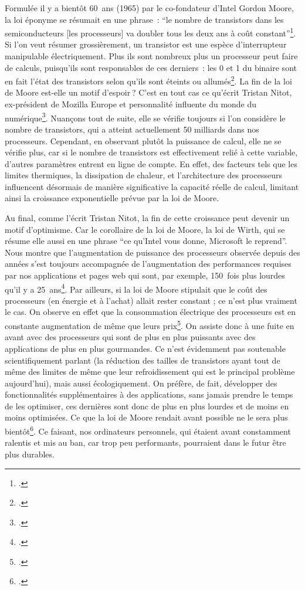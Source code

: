 Formulée il y a bientôt 60 ans (1965) par le co-fondateur d’Intel Gordon Moore, la loi éponyme se résumait en une phrase : \enquote{le nombre de transistors dans les semiconducteurs [les processeurs] va doubler tous les deux ans à coût constant}\footcite{zotero-301}. Si l’on veut résumer grossièrement, un transistor est une espèce d’interrupteur manipulable électriquement. Plus ils sont nombreux plus un processeur peut faire de calculs, puisqu’ils sont responsables de ces derniers : les 0 et 1 du binaire sont en fait l’état des transistors selon qu’ils sont éteints ou allumés\footcite{2024e}. La fin de la loi de Moore est-elle un motif d’espoir ? C’est en tout cas ce qu’écrit Tristan Nitot, ex-président de Mozilla Europe et personnalité influente du monde du numérique\footcite{nitot_loi_2024}. Nuançons tout de suite, elle se vérifie toujours si l'on considère le nombre de transistors, qui a atteint actuellement 50 milliards dans nos processeurs. Cependant, en observant plutôt la puissance de calcul, elle ne se vérifie plus, car si le nombre de transistors est effectivement relié à cette variable, d’autres paramètres entrent en ligne de compte. En effet, des facteurs tels que les limites thermiques, la dissipation de chaleur, et l'architecture des processeurs influencent désormais de manière significative la capacité réelle de calcul, limitant ainsi la croissance exponentielle prévue par la loi de Moore.

Au final, comme l’écrit Tristan Nitot, la fin de cette croissance peut devenir un motif d’optimisme. Car le corollaire de la loi de Moore, la loi de Wirth, qui se résume elle aussi en une phrase \enquote{ce qu’Intel vous donne, Microsoft le reprend}. Nous montre que l’augmentation de puissance des processeurs observée depuis des années s’est toujours accompagnée de l'augmentation des performances requises par nos applications et pages web qui sont, par exemple, 150 fois plus lourdes qu’il y a 25 ans\footcite[§ 8]{nitot_loi_2024}. Par ailleurs, si la loi de Moore stipulait que le coût des processeurs (en énergie et à l'achat) allait rester constant ; ce n’est plus vraiment le cas. On observe en effet que la consommation électrique des processeurs est en constante augmentation de même que leurs prix\footcite[§ 4- § 6]{nitot_loi_2024}. On assiste donc à une fuite en avant avec des processeurs qui sont de plus en plus puissants avec des applications de plus en plus gourmandes. Ce n’est évidemment pas soutenable scientifiquement parlant (la réduction des tailles de transistors ayant tout de même des limites de même que leur refroidissement qui est le principal problème aujourd’hui), mais aussi écologiquement. On préfère, de fait, développer des fonctionnalités supplémentaires à des applications, sans jamais prendre le temps de les optimiser, ces dernières sont donc de plus en plus lourdes et de moins en moins optimisées. Ce que la loi de Moore rendait avant possible ne le sera plus bientôt\footcite[§ 9]{nitot_loi_2024}. Ce faisant, nos ordinateurs personnels, qui étaient avant constamment ralentis et mis au ban, car trop peu performants, pourraient dans le futur être plus durables.

